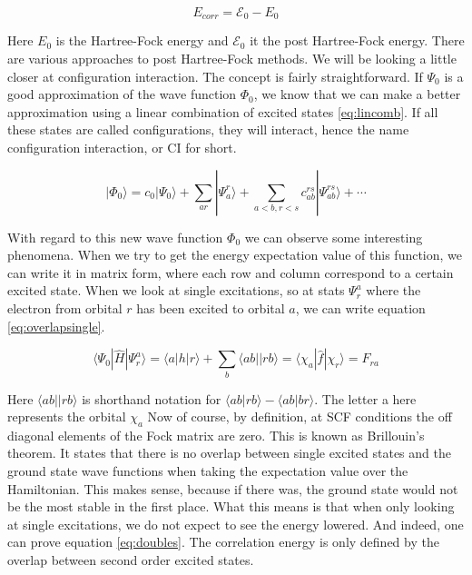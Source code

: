 \documentclass[twoside,twocolumn,9pt]{article}
\begin{document}
\begin{equation}\label{eq:Ecorr}
  E_{corr} = \mathcal{E}_0 - E_0
\end{equation}

Here $E_0$ is the Hartree-Fock energy and $\mathcal{E}_0$ it the post Hartree-Fock energy. There are various approaches to post Hartree-Fock methods. We will be looking a little closer
at configuration interaction. The concept is fairly straightforward. If $\Psi_0$ is a good approximation of the wave function $\Phi_0$, we know that we can make a better approximation
using a linear combination of excited states \eqref{eq:lincomb}\cite{Szabo1996}. If all these states are called configurations, they will interact, hence the name configuration
interaction, or CI for short.

\begin{equation}\label{eq:lincomb}
  |\Phi_0\rangle = c_0|\Psi_0\rangle + \sum_{ar}|\Psi_a^r\rangle + \sum_{a<b,r<s}c_{ab}^{rs}|\Psi^{rs}_{ab} \rangle + \cdots
\end{equation}

With regard to this new wave function $\Phi_0$ we can observe some interesting phenomena. When we try to get the energy expectation value of this function, we can write it in matrix
form, where each row and column correspond to a certain excited state. When we look at single excitations, so at stats $\Psi_r^a$ where the electron from orbital $r$ has been
excited to orbital $a$, we can write equation \eqref{eq:overlapsingle}\cite{Szabo1996}.

\begin{equation}\label{eq:overlapsingle}
  \langle\Psi_0 |\hat{H}|\Psi_r^a\rangle = \langle a|h|r \rangle + \sum_b \langle ab||rb \rangle = \langle \chi_a |\hat{f}| \chi_r \rangle = F_{ra}
\end{equation}

Here $\langle ab||rb \rangle$ is shorthand notation for $\langle ab | rb \rangle - \langle ab | br \rangle$. The letter a here represents the orbital $\chi_a$
Now of course, by definition, at SCF conditions the off diagonal elements of the Fock matrix are zero. This is known as Brillouin's theorem. It states that there is no overlap
between single excited states and the ground state wave functions when taking the expectation value over the Hamiltonian. This makes sense, because if there was, the ground state
would not be the most stable in the first place. What this means is that when only looking at single excitations, we do not expect to see the energy lowered. And indeed, one can
prove equation \eqref{eq:doubles}\cite{Szabo1996}. The correlation energy is only defined by the overlap between second order excited states.
\end{document}
